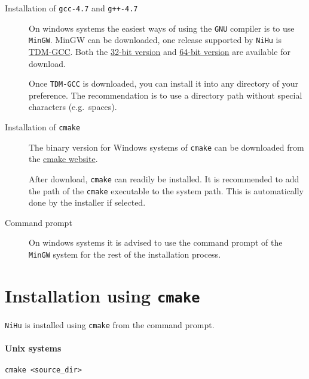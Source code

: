 \documentclass[a4paper,10pt]{article}
\begin{document}
\begin{description}
	\item [Installation of \texttt{gcc-4.7} and \texttt{g++-4.7}]
	
	On windows systems the easiest ways of using the \texttt{GNU} compiler is to use \texttt{MinGW}.
	MinGW can be downloaded, one release supported by \texttt{NiHu} is \href{http://tdm-gcc.tdragon.net/download}{TDM-GCC}. Both the \href{http://sourceforge.net/projects/tdm-gcc/files/TDM-GCC\%20Installer/tdm-gcc-4.7.1-2.exe/download}{32-bit version} and \href{http://sourceforge.net/projects/tdm-gcc/files/TDM-GCC\%20Installer/tdm64-gcc-4.7.1-3.exe/download}{64-bit version} are available for download.
	
	Once \texttt{TDM-GCC} is downloaded, you can install it into any directory of your preference. The recommendation is to use a directory path without special characters (e.g.\ spaces).

	\item [Installation of \texttt{cmake}]

	The binary version for Windows systems of \texttt{cmake} can be downloaded from the \href{http://www.cmake.org/files/v2.8/cmake-2.8.11.2-win32-x86.exe}{cmake website}.

	After download, \texttt{cmake} can readily be installed. It is recommended to add the path of the \texttt{cmake} executable to the system path. This is automatically done by the installer if selected.

	\item [Command prompt]

	On windows systems it is advised to use the command prompt of the \texttt{MinGW} system for the rest of the installation process.

\end{description}

\section{Installation using \texttt{cmake}}

\texttt{NiHu} is installed using \texttt{cmake} from the command prompt.

\paragraph{Unix systems}

\begin{verbatim}
cmake <source_dir>
\end{verbatim}
\end{document}
